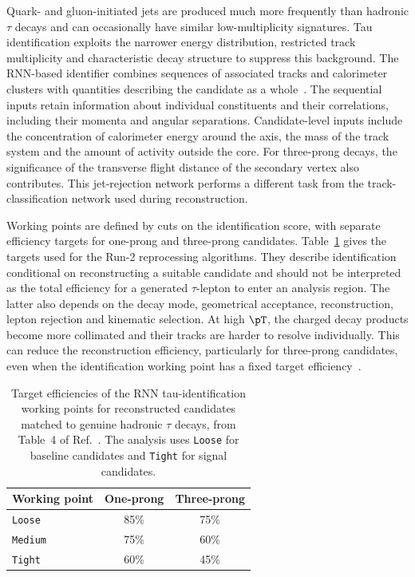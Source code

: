 Quark- and gluon-initiated jets are produced much more frequently than hadronic $\tau$ decays and can occasionally have similar low-multiplicity signatures.
Tau identification exploits the narrower energy distribution, restricted track multiplicity and characteristic decay structure to suppress this background.
The RNN-based identifier combines sequences of associated tracks and calorimeter clusters with quantities describing the candidate as a whole~\cite{ATLAS2019TauRNN,ATLAS2022TauR22}.
The sequential inputs retain information about individual constituents and their correlations, including their momenta and angular separations.
Candidate-level inputs include the concentration of calorimeter energy around the axis, the mass of the track system and the amount of activity outside the core.
For three-prong decays, the significance of the transverse flight distance of the secondary vertex also contributes.
This jet-rejection network performs a different task from the track-classification network used during reconstruction.

Working points are defined by cuts on the identification score, with separate efficiency targets for one-prong and three-prong candidates.
Table~\ref{tab:ch6_tau_id} gives the targets used for the Run-2 reprocessing algorithms.
They describe identification conditional on reconstructing a suitable candidate and should not be interpreted as the total efficiency for a generated $\tau$-lepton to enter an analysis region.
The latter also depends on the decay mode, geometrical acceptance, reconstruction, lepton rejection and kinematic selection.
At high $\pT$, the charged decay products become more collimated and their tracks are harder to resolve individually.
This can reduce the reconstruction efficiency, particularly for three-prong candidates, even when the identification working point has a fixed target efficiency~\cite{ATLAS2022TauR22}.

\begin{table}[htbp]
    \centering
    \caption{Target efficiencies of the RNN tau-identification working points for reconstructed candidates matched to genuine hadronic $\tau$ decays, from Table~4 of Ref.~\cite{ATLAS2022TauR22}. The analysis uses \texttt{Loose} for baseline candidates and \texttt{Tight} for signal candidates.}
    \label{tab:ch6_tau_id}
    \begin{tabular}{lcc}
        \toprule
        Working point & One-prong & Three-prong \\
        \midrule
        \texttt{Loose}  & 85\% & 75\% \\
        \texttt{Medium} & 75\% & 60\% \\
        \texttt{Tight}  & 60\% & 45\% \\
        \bottomrule
    \end{tabular}
\end{table}

